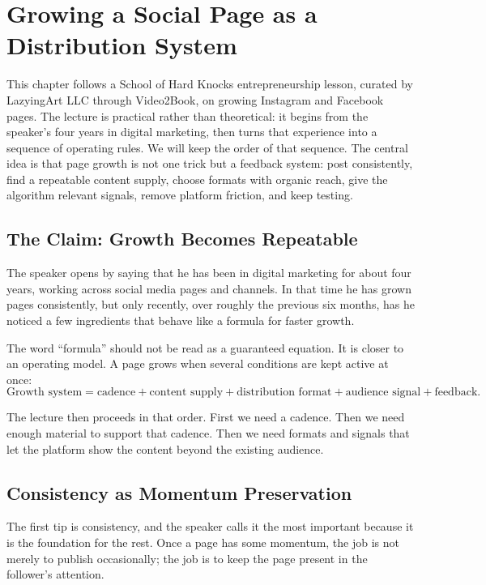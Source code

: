 \chapter{Growing a Social Page as a Distribution System}

This chapter follows a School of Hard Knocks entrepreneurship lesson, curated by LazyingArt LLC through Video2Book, on growing Instagram and Facebook pages. The lecture is practical rather than theoretical: it begins from the speaker's four years in digital marketing, then turns that experience into a sequence of operating rules. We will keep the order of that sequence. The central idea is that page growth is not one trick but a feedback system: post consistently, find a repeatable content supply, choose formats with organic reach, give the algorithm relevant signals, remove platform friction, and keep testing.

\section{The Claim: Growth Becomes Repeatable}

The speaker opens by saying that he has been in digital marketing for about four years, working across social media pages and channels. In that time he has grown pages consistently, but only recently, over roughly the previous six months, has he noticed a few ingredients that behave like a formula for faster growth.

The word ``formula'' should not be read as a guaranteed equation. It is closer to an operating model. A page grows when several conditions are kept active at once:
\begin{equation}
\text{Growth system}
=
\text{cadence}
+
\text{content supply}
+
\text{distribution format}
+
\text{audience signal}
+
\text{feedback}.
\end{equation}

The lecture then proceeds in that order. First we need a cadence. Then we need enough material to support that cadence. Then we need formats and signals that let the platform show the content beyond the existing audience.

\section{Consistency as Momentum Preservation}

The first tip is consistency, and the speaker calls it the most important because it is the foundation for the rest. Once a page has some momentum, the job is not merely to publish occasionally; the job is to keep the page present in the follower's attention.

